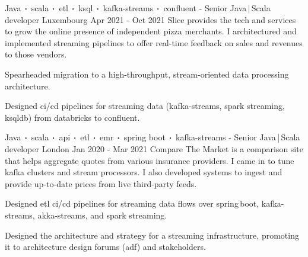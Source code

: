 \begin{cventries}

    \cventry
    {Java$\sqbig$scala$\sqbig$etl$\sqbig$ksql$\sqbig$kafka-streams$\sqbig$confluent}
    { - Senior Java\,|\,Scala developer}
    {Luxembourg}
    {Apr 2021 - Oct 2021}
    {Slice provides the tech and services to grow the online presence of independent pizza merchants. I architectured and implemented streaming pipelines to offer real-time feedback on sales and revenues to those vendors.}
    {
        \begin{cvitems}
            \item{Spearheaded migration to a high-throughput, stream-oriented data processing architecture.}
            \item{Designed ci/cd pipelines for streaming data (kafka-streams, spark streaming, ksqldb) from databricks to confluent.}
        \end{cvitems}
    }

    \cventry
    {Java$\sqbig$scala$\sqbig$api$\sqbig$etl$\sqbig$emr$\sqbig$spring boot$\sqbig$kafka-streams}
    { - Senior Java\,|\,Scala developer}
    {London}
    {Jan 2020 - Mar 2021}
    {Compare The Market is a comparison site that helps aggregate quotes from various insurance providers. I came in to tune kafka clusters and stream processors. I also developed systems to ingest and provide up-to-date prices from live third-party feeds.}
    {
        \begin{cvitems}
            \item{Designed etl ci/cd pipelines for streaming data flows over spring\,boot, kafka-streams, akka-streams, and spark streaming.}
            \item{Designed the architecture and strategy for a streaming infrastructure, promoting it to architecture design forums (adf) and stakeholders.}
        \end{cvitems}
    }


\end{cventries}
